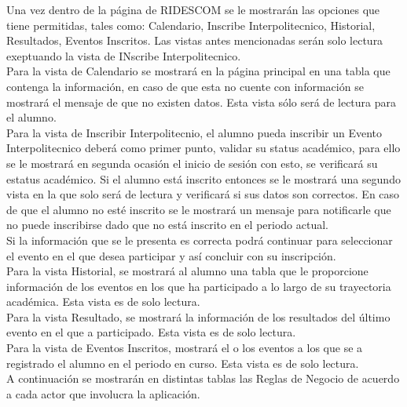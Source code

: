 Una vez dentro de la página de RIDESCOM se le mostrarán las opciones que tiene permitidas, tales como: Calendario, Inscribe Interpolitecnico, Historial,  Resultados, Eventos Inscritos. Las vistas antes mencionadas serán solo lectura exeptuando la vista de INscribe Interpolitecnico.\\

Para la vista de Calendario se mostrará en la página principal en una tabla que contenga la información, en caso de que esta no cuente con información se mostrará el mensaje de que no existen datos. Esta vista sólo será de lectura para el alumno.\\

Para la vista de Inscribir Interpolitecnio, el alumno pueda inscribir un Evento Interpolitecnico deberá como primer punto, validar su status académico, para ello se le mostrará en segunda ocasión el inicio de sesión con esto, se verificará su estatus académico. Si el alumno está inscrito entonces se le mostrará una segundo vista en la que solo será de lectura y verificará si sus datos son correctos. En caso de que el alumno no esté inscrito se le mostrará un mensaje para notificarle que no puede inscribirse dado que no está inscrito en el periodo actual. \\
Si la información que se le presenta es correcta podrá continuar para seleccionar el evento en el que desea participar y así concluir con su inscripción. \\

Para la vista Historial, se mostrará al alumno una tabla que le proporcione información de los eventos en los que ha participado a lo largo de su trayectoria académica. Esta vista es de solo lectura.\\

Para la vista Resultado, se mostrará la información de los resultados del último evento en el que a participado. Esta vista es de solo lectura.\\

Para la vista de Eventos Inscritos, mostrará el o los eventos a los que se a registrado el alumno en el periodo en curso. Esta vista es de solo lectura.\\

\noindent A continuación se mostrarán en distintas tablas las Reglas de Negocio de acuerdo a cada actor que involucra la aplicación.

